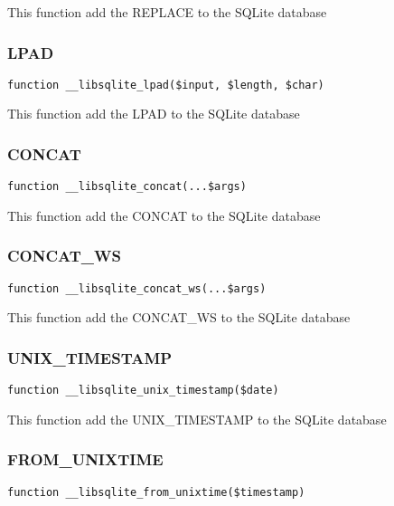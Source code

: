 \documentclass[a4paper]{article}
\begin{document}
This function add the REPLACE to the SQLite database

\hypertarget{toc296}{}
\subsubsection{LPAD}

\begin{lstlisting}
function __libsqlite_lpad($input, $length, $char)
\end{lstlisting}

This function add the LPAD to the SQLite database

\hypertarget{toc297}{}
\subsubsection{CONCAT}

\begin{lstlisting}
function __libsqlite_concat(...$args)
\end{lstlisting}

This function add the CONCAT to the SQLite database

\hypertarget{toc298}{}
\subsubsection{CONCAT\_WS}

\begin{lstlisting}
function __libsqlite_concat_ws(...$args)
\end{lstlisting}

This function add the CONCAT\_WS to the SQLite database

\hypertarget{toc299}{}
\subsubsection{UNIX\_TIMESTAMP}

\begin{lstlisting}
function __libsqlite_unix_timestamp($date)
\end{lstlisting}

This function add the UNIX\_TIMESTAMP to the SQLite database

\hypertarget{toc300}{}
\subsubsection{FROM\_UNIXTIME}

\begin{lstlisting}
function __libsqlite_from_unixtime($timestamp)
\end{lstlisting}
\end{document}
